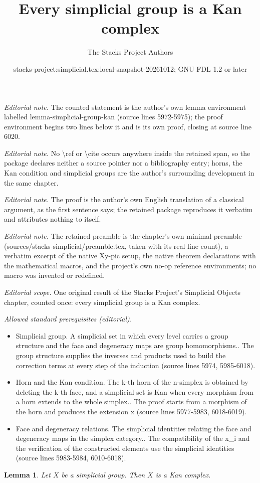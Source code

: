 \documentclass{stacks-project}
\title{Every simplicial group is a Kan complex}
\author{The Stacks Project Authors}
\date{stacks-project:simplicial.tex:local-snapshot-20261012; GNU FDL 1.2 or later}
\theoremstyle{plain}
\newtheorem{lemma}[subsection]{Lemma}
\theoremstyle{definition}
\theoremstyle{remark}
\numberwithin{equation}{subsection}
\begin{document}
\maketitle
\noindent\textit{Editorial note.} The counted statement is the author's own lemma environment labelled lemma-simplicial-group-kan (source lines 5972-5975); the proof environment begins two lines below it and is its own proof, closing at source line 6020.\par\medskip
\noindent\textit{Editorial note.} No \textbackslash{}ref or \textbackslash{}cite occurs anywhere inside the retained span, so the package declares neither a source pointer nor a bibliography entry; horns, the Kan condition and simplicial groups are the author's surrounding development in the same chapter.\par\medskip
\noindent\textit{Editorial note.} The proof is the author's own English translation of a classical argument, as the first sentence says; the retained package reproduces it verbatim and attributes nothing to itself.\par\medskip
\noindent\textit{Editorial note.} The retained preamble is the chapter's own minimal preamble (sources/stacks-simplicial/preamble.tex, taken with its real line count), a verbatim excerpt of the native Xy-pic setup, the native theorem declarations with the mathematical macros, and the project's own no-op reference environments; no macro was invented or redefined.\par\medskip
\noindent\textit{Editorial scope.} One original result of the Stacks Project's Simplicial Objects chapter, counted once: every simplicial group is a Kan complex.\par\medskip
\noindent\textit{Allowed standard prerequisites (editorial).}\begin{itemize}
\item Simplicial group. A simplicial set in which every level carries a group structure and the face and degeneracy maps are group homomorphisms.. The group structure supplies the inverses and products used to build the correction terms at every step of the induction (source lines 5974, 5985-6018).
\item Horn and the Kan condition. The k-th horn of the n-simplex is obtained by deleting the k-th face, and a simplicial set is Kan when every morphism from a horn extends to the whole simplex.. The proof starts from a morphism of the horn and produces the extension x (source lines 5977-5983, 6018-6019).
\item Face and degeneracy relations. The simplicial identities relating the face and degeneracy maps in the simplex category.. The compatibility of the x\_i and the verification of the constructed elements use the simplicial identities (source lines 5983-5984, 6010-6018).
\end{itemize}\medskip
\begin{lemma}
\label{lemma-simplicial-group-kan}
Let $X$ be a simplicial group. Then $X$ is a Kan complex.
\end{lemma}
\end{document}
